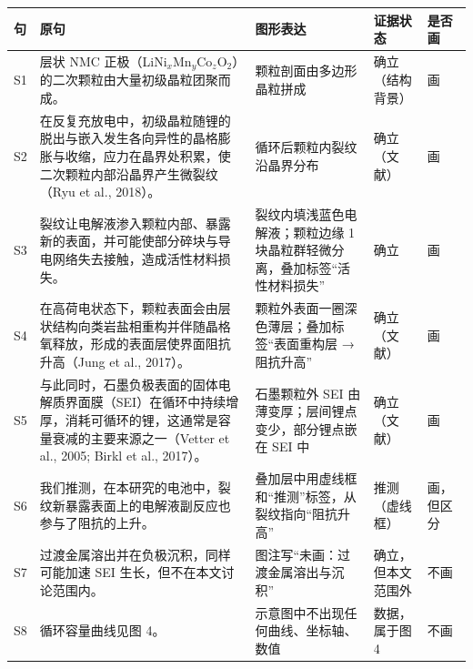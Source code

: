 \begingroup
\setlength{\tabcolsep}{1.6pt}
\renewcommand{\arraystretch}{1}
\newcommand{\cellfont}{\fontsize{8}{9.3}\selectfont}
\newcommand{\gr}{\leavevmode\color{gray}}
\begin{tabularx}{\linewidth}{@{}
  >{\cellfont}l
  >{\cellfont}Y
  >{\cellfont\raggedright\arraybackslash}p{26mm}
  >{\cellfont\raggedright\arraybackslash}p{21mm}
  >{\cellfont\raggedright\arraybackslash}p{15.5mm}
@{}}
\toprule
\textbf{句} & \textbf{原句} & \textbf{图形表达} & \textbf{证据状态} & \textbf{是否画} \\
\midrule
S1 & 层状 NMC 正极（LiNi$_x$Mn$_y$Co$_z$O$_2$）的二次颗粒由大量初级晶粒团聚而成。
   & 颗粒剖面由多边形晶粒拼成
   & 确立（结构背景） & 画 \\
S2 & 在反复充放电中，初级晶粒随锂的脱出与嵌入发生各向异性的晶格膨胀与收缩，应力在晶界处积累，使二次颗粒内部沿晶界产生微裂纹（Ryu et al., 2018）。
   & 循环后颗粒内裂纹沿晶界分布
   & 确立（文献） & 画 \\
S3 & 裂纹让电解液渗入颗粒内部、暴露新的表面，并可能使部分碎块与导电网络失去接触，造成活性材料损失。
   & 裂纹内填浅蓝色电解液；颗粒边缘 1 块晶粒群轻微分离，叠加标签“活性材料损失”
   & 确立 & 画 \\
S4 & 在高荷电状态下，颗粒表面会由层状结构向类岩盐相重构并伴随晶格氧释放，形成的表面层使界面阻抗升高（Jung et al., 2017）。
   & 颗粒外表面一圈深色薄层；叠加标签“表面重构层 → 阻抗升高”
   & 确立（文献） & 画 \\
S5 & 与此同时，石墨负极表面的固体电解质界面膜（SEI）在循环中持续增厚，消耗可循环的锂，这通常是容量衰减的主要来源之一（Vetter et al., 2005; Birkl et al., 2017）。
   & 石墨颗粒外 SEI 由薄变厚；层间锂点变少，部分锂点嵌在 SEI 中
   & 确立（文献） & 画 \\
S6 & 我们推测，在本研究的电池中，裂纹新暴露表面上的电解液副反应也参与了阻抗的上升。
   & 叠加层中用虚线框和“推测”标签，从裂纹指向“阻抗升高”
   & 推测（虚线框） & 画，但区分 \\
\gr S7 & \gr 过渡金属溶出并在负极沉积，同样可能加速 SEI 生长，但不在本文讨论范围内。
   & \gr 图注写“未画：过渡金属溶出与沉积”
   & \gr 确立，但本文范围外 & \gr 不画 \\
\gr S8 & \gr 循环容量曲线见图 4。
   & \gr 示意图中不出现任何曲线、坐标轴、数值
   & \gr 数据，属于图 4 & \gr 不画 \\
\bottomrule
\end{tabularx}
\endgroup
